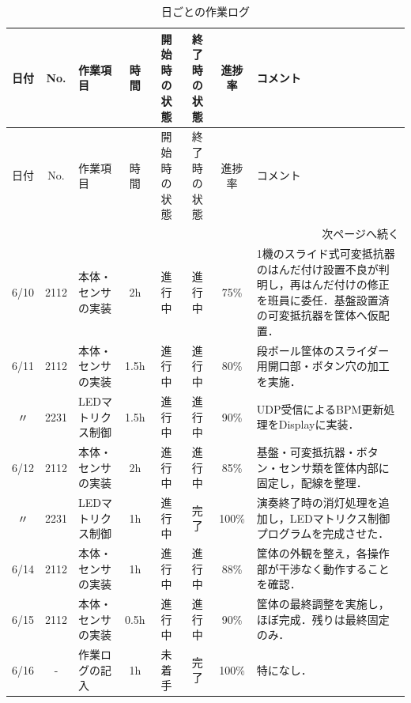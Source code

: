 \documentclass[uplatex,dvipdfmx,a4paper,11pt]{jsarticle}
\begin{document}
    \begin{longtable}{|c|c|p{2.4cm}|c|c|c|c|p{3.8cm}|}
    \caption{日ごとの作業ログ} \\
    \hline
    日付 & No. & 作業項目 & 時間 & 開始時の状態 & 終了時の状態 & 進捗率 & コメント \\
    \hline
    \endfirsthead

    \hline
    日付 & No. & 作業項目 & 時間 & 開始時の状態 & 終了時の状態 & 進捗率 & コメント \\
    \hline
    \endhead

    \hline
    \multicolumn{8}{r}{次ページへ続く} \\
    \hline
    \endfoot

    \hline
    \endlastfoot

    6/10 & 2112 & 本体・センサの実装 & 2h &
    進行中 &
    進行中 &
    75\% &
    1機のスライド式可変抵抗器のはんだ付け設置不良が判明し，再はんだ付けの修正を班員に委任．基盤設置済の可変抵抗器を筐体へ仮配置． \\
    \hline

    6/11 & 2112 & 本体・センサの実装 & 1.5h &
    進行中 &
    進行中 &
    80\% &
    段ボール筐体のスライダー用開口部・ボタン穴の加工を実施． \\
    \hline

    〃 & 2231 & LEDマトリクス制御 & 1.5h &
    進行中 &
    進行中 &
    90\% &
    UDP受信によるBPM更新処理をDisplayに実装． \\
    \hline

    6/12 & 2112 & 本体・センサの実装 & 2h &
    進行中 &
    進行中 &
    85\% &
    基盤・可変抵抗器・ボタン・センサ類を筐体内部に固定し，配線を整理． \\
    \hline

    〃 & 2231 & LEDマトリクス制御 & 1h &
    進行中 &
    完了 &
    100\% &
    演奏終了時の消灯処理を追加し，LEDマトリクス制御プログラムを完成させた． \\
    \hline

    6/14 & 2112 & 本体・センサの実装 & 1h &
    進行中 &
    進行中 &
    88\% &
    筐体の外観を整え，各操作部が干渉なく動作することを確認． \\
    \hline

    6/15 & 2112 & 本体・センサの実装 & 0.5h &
    進行中 &
    進行中 &
    90\% &
    筐体の最終調整を実施し，ほぼ完成．残りは最終固定のみ． \\
    \hline

    6/16 & - & 作業ログの記入 & 1h &
    未着手 &
    完了 &
    100\% &
    特になし． \\

    \end{longtable}
\end{document}
